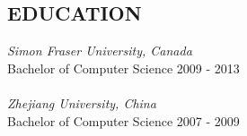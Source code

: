 \documentclass[line,margin]{res}
\begin{document}
\begin{resume}
\section{EDUCATION}
				{\sl Simon Fraser University, Canada}\\
				Bachelor of Computer Science 
				2009 - 2013 \\
				\\
				{\sl Zhejiang University, China} \\
				Bachelor of Computer Science	
				2007 - 2009  

\end{resume}
\end{document}
